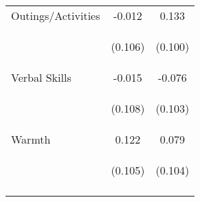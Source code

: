 \begin{tabular}{lcc}
\noalign{\smallskip}Outings/Activities & -0.012 & 0.133\\
 & \begin{footnotesize}(0.106)\end{footnotesize} & \begin{footnotesize}(0.100)\end{footnotesize}\\
\noalign{\smallskip}Verbal Skills & -0.015 & -0.076\\
 & \begin{footnotesize}(0.108)\end{footnotesize} & \begin{footnotesize}(0.103)\end{footnotesize}\\
\noalign{\smallskip}Warmth & 0.122 & 0.079\\
 & \begin{footnotesize}(0.105)\end{footnotesize} & \begin{footnotesize}(0.104)\end{footnotesize}\\
\noalign{\smallskip}\hline\end{tabular}\\
